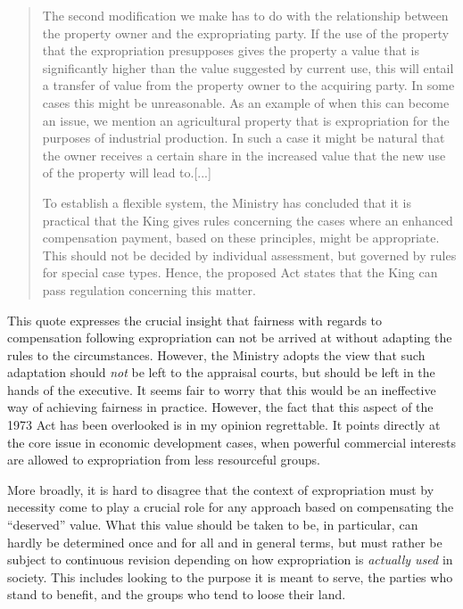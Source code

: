 \begin{quote}
The second modification we make has to do with the relationship between the property owner and the expropriating party. If the use of the property that the expropriation presupposes gives the property a value that is significantly higher than the value suggested by current use, this will entail a transfer of value from the property owner to the acquiring party. In some cases this might be unreasonable. As an example of when this can become an issue, we mention an agricultural property that is expropriation for the purposes of industrial production. In such a case it might be natural that the owner receives a certain share in the increased value that the new use of the property will lead to.[...] %

To establish a flexible system, the Ministry has concluded that it is practical that the King gives rules concerning the cases where an enhanced compensation payment, based on these principles, might be appropriate. This should not be decided by individual assessment, but governed by rules for special case types. Hence, the proposed Act states that the King can pass regulation concerning this matter.
\end{quote}

This quote expresses the crucial insight that fairness with regards to compensation following expropriation can not be arrived at without adapting the rules to the circumstances. However, the Ministry adopts the view that such adaptation should {\it not} be left to the appraisal courts, but should be left in the hands of the executive. It seems fair to worry that this would be an ineffective way of achieving fairness in practice. However, the fact that this aspect of the 1973 Act has been overlooked is in my opinion regrettable. It points directly at the core issue in economic development cases, when powerful commercial interests are allowed to expropriation from less resourceful groups. 

More broadly, it is hard to disagree that the context of expropriation must by necessity come to play a crucial role for any approach based on compensating the ``deserved'' value. What this value should be taken to be, in particular, can hardly be determined once and for all and in general terms, but must rather be subject to continuous revision depending on how expropriation is \emph{actually used} in society. This includes looking to the purpose it is meant to serve, the parties who stand to benefit, and the groups who tend to loose their land.

